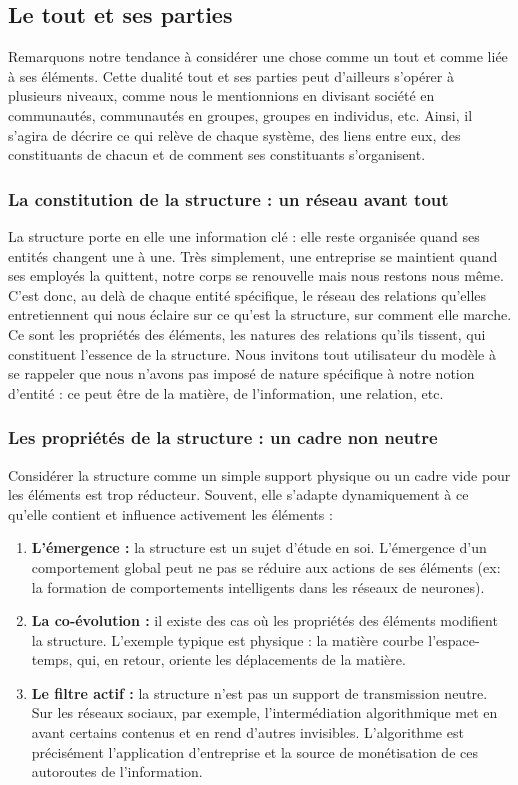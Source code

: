 \documentclass[11pt]{article}
\begin{document}
	
	\subsection{Le tout et ses parties} 
	
	Remarquons notre tendance à considérer une chose comme un tout et comme liée à ses éléments. Cette dualité \og{}tout et ses parties\fg{} peut d'ailleurs s'opérer à plusieurs niveaux, comme nous le mentionnions en divisant société en communautés, communautés en groupes, groupes en individus, etc. Ainsi, il s'agira de décrire ce qui relève de chaque système, des liens entre eux, des constituants de chacun et de comment ses constituants s'organisent. 
	
	\subsubsection*{La constitution de la structure : un réseau avant tout}
	
	La structure porte en elle une information clé : elle reste organisée quand ses entités changent une à une. Très simplement, une entreprise se maintient quand ses employés la quittent, notre corps se renouvelle mais nous restons nous même. C'est donc, au delà de chaque entité spécifique, le réseau des relations qu'elles entretiennent qui nous éclaire sur ce qu'est la structure, sur comment elle marche. Ce sont les propriétés des éléments, les natures des relations qu'ils tissent, qui constituent l'essence de la structure. Nous invitons tout utilisateur du modèle à se rappeler que nous n'avons pas imposé de nature spécifique à notre notion d'entité : ce peut être de la matière, de l'information, une relation, etc.
	
	\subsubsection*{Les propriétés de la structure : un cadre non neutre}
	
	Considérer la structure comme un simple support physique ou un cadre vide pour les éléments est trop réducteur. Souvent, elle s'adapte dynamiquement à ce qu'elle contient et influence activement les éléments :
	\begin{enumerate}
		\item \textbf{L'émergence :} la structure est un sujet d'étude en soi. L'émergence d'un comportement global peut ne pas se réduire aux actions de ses éléments (ex: la formation de comportements intelligents dans les réseaux de neurones).
		\item \textbf{La co-évolution :} il existe des cas où les propriétés des éléments modifient la structure. L'exemple typique est physique : la matière courbe l'espace-temps, qui, en retour, oriente les déplacements de la matière.
		\item \textbf{Le filtre actif :} la structure n'est pas un support de transmission neutre. Sur les réseaux sociaux, par exemple, l'intermédiation algorithmique met en avant certains contenus et en rend d'autres invisibles. L'algorithme est précisément l'application d'entreprise et la source de monétisation de ces autoroutes de l'information.
	\end{enumerate}
	
\end{document}
